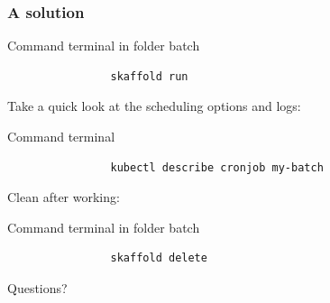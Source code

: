 	\begin{frame}[fragile]
		\frametitle{A solution}
		
		\begin{block}{Command terminal in folder batch}
			\begin{verbatim}
				skaffold run
			\end{verbatim}
		\end{block}
		
		\bigskip
		
		Take a quick look at the scheduling options and logs:
		\begin{block}{Command terminal}
			\begin{verbatim}
				kubectl describe cronjob my-batch
			\end{verbatim}
		\end{block}
		
		\bigskip
		
		Clean after working:
		\begin{block}{Command terminal in folder batch}
			\begin{verbatim}
				skaffold delete
			\end{verbatim}
		\end{block}
	\end{frame}
	
	\begin{frame}
		\begin{center}
			Questions?
		\end{center}
	\end{frame}